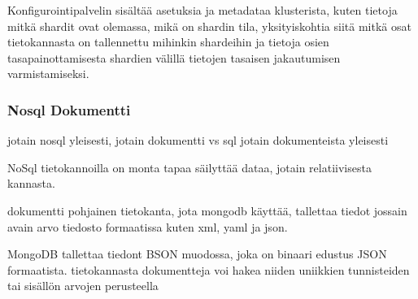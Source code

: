 Konfigurointipalvelin sisältää asetuksia ja metadataa klusterista, 
kuten tietoja mitkä shardit ovat olemassa, mikä on shardin tila,
yksityiskohtia siitä mitkä osat tietokannasta on tallennettu mihinkin shardeihin
ja tietoja osien tasapainottamisesta shardien välillä tietojen tasaisen jakautumisen varmistamiseksi.



\subsubsection{Nosql Dokumentti}



jotain nosql yleisesti, jotain dokumentti vs sql
jotain dokumenteista yleisesti

\medskip

NoSql tietokannoilla on monta tapaa säilyttää dataa, jotain relatiivisesta kannasta. 

dokumentti pohjainen tietokanta, jota mongodb käyttää, tallettaa tiedot jossain avain arvo tiedosto formaatissa kuten xml, yaml ja json. \citemissing
\medskip


MongoDB tallettaa tiedont BSON muodossa, joka on binaari edustus JSON formaatista.
tietokannasta dokumentteja voi hakea niiden uniikkien tunnisteiden tai sisällön arvojen perusteella
\medskip


















    





